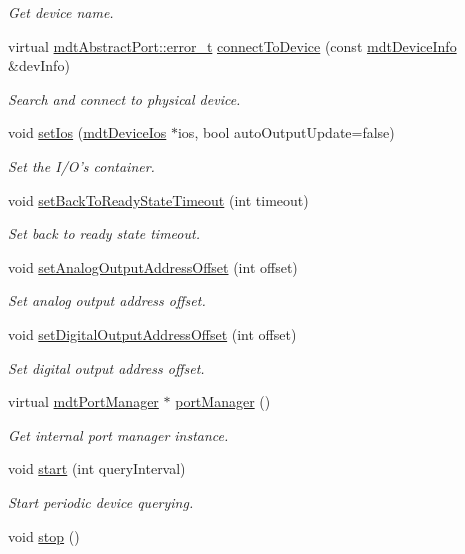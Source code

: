 \begin{DoxyCompactItemize}
\begin{DoxyCompactList}\small\item\em Get device name. \end{DoxyCompactList}\item 
virtual \hyperlink{classmdt_abstract_port_ad4121bb930c95887e77f8bafa065a85e}{mdtAbstractPort::error\_\-t} \hyperlink{classmdt_device_abab1b6e45af527880ce469ae318474c0}{connectToDevice} (const \hyperlink{classmdt_device_info}{mdtDeviceInfo} \&devInfo)
\begin{DoxyCompactList}\small\item\em Search and connect to physical device. \end{DoxyCompactList}\item 
void \hyperlink{classmdt_device_a9f1de62ef54974b0636dee673bd819e2}{setIos} (\hyperlink{classmdt_device_ios}{mdtDeviceIos} $\ast$ios, bool autoOutputUpdate=false)
\begin{DoxyCompactList}\small\item\em Set the I/O's container. \end{DoxyCompactList}\item 
void \hyperlink{classmdt_device_aa241c40514683254990e742cf1bbb155}{setBackToReadyStateTimeout} (int timeout)
\begin{DoxyCompactList}\small\item\em Set back to ready state timeout. \end{DoxyCompactList}\item 
void \hyperlink{classmdt_device_a3477278b4fa937f7667becb14333ef2f}{setAnalogOutputAddressOffset} (int offset)
\begin{DoxyCompactList}\small\item\em Set analog output address offset. \end{DoxyCompactList}\item 
void \hyperlink{classmdt_device_af5c2759221878a4d0306343f43e3cc45}{setDigitalOutputAddressOffset} (int offset)
\begin{DoxyCompactList}\small\item\em Set digital output address offset. \end{DoxyCompactList}\item 
virtual \hyperlink{classmdt_port_manager}{mdtPortManager} $\ast$ \hyperlink{classmdt_device_a06d9178b4133fd7b23084e712af20976}{portManager} ()
\begin{DoxyCompactList}\small\item\em Get internal port manager instance. \end{DoxyCompactList}\item 
void \hyperlink{classmdt_device_a721c5bf2cfa0eef5304333f08da182f7}{start} (int queryInterval)
\begin{DoxyCompactList}\small\item\em Start periodic device querying. \end{DoxyCompactList}\item 
\hypertarget{classmdt_device_adc7ff8f01d68506283a3d0cc6bc25407}{
void \hyperlink{classmdt_device_adc7ff8f01d68506283a3d0cc6bc25407}{stop} ()}
\label{classmdt_device_adc7ff8f01d68506283a3d0cc6bc25407}


\end{DoxyCompactItemize}
